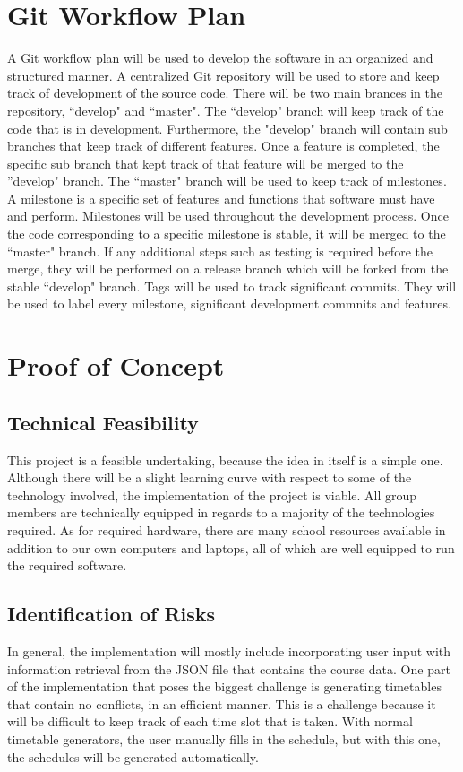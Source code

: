 \documentclass[12pt]{article}
\begin{document}
\newpage
\section{Git Workflow Plan}
\tab A Git workflow plan will be used to develop the software in an organized and structured manner. A centralized Git repository will be used to store and keep track of development of the source code. There will be two main brances in the repository, ``develop" and ``master". The ``develop" branch will keep track of the code that is in development. Furthermore, the "develop" branch will contain sub branches that keep track of different features. Once a feature is completed, the specific sub branch that kept track of that feature will be merged to the ”develop" branch. The ``master" branch will be used to keep track of milestones. A milestone is a specific set of features and functions that software must have and perform. Milestones will be used throughout the development process. Once the code corresponding to a specific milestone is stable, it will be merged to the ``master" branch. If any additional steps such as testing is required before the merge, they will be performed on a release branch which will be forked from the stable ``develop" branch. Tags will be used to track significant commits. They will be used to label every milestone, significant development commnits and features.

\newpage
\section{Proof of Concept}
\subsection{Technical Feasibility}
This project is a feasible undertaking, because the idea in itself is a simple one. Although there will be a slight learning curve with respect to some of the technology involved, the implementation of the project is viable. All group members are technically equipped in regards to a majority of the technologies required. As for required hardware, there are many school resources available in addition to our own computers and laptops, all of which are well equipped to run the required software. 

\subsection{Identification of Risks}
In general, the implementation will mostly include incorporating user input with information retrieval from the JSON file that contains the course data. One part of the implementation that poses the biggest challenge is generating timetables that contain no conflicts, in an efficient manner. This is a challenge because it will be difficult to keep track of each time slot that is taken. With normal timetable generators, the user manually fills in the schedule, but with this one, the schedules will be generated automatically. \\
\end{document}
